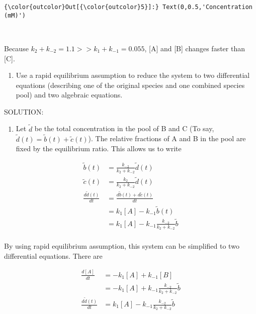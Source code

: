 \documentclass[11pt]{article}
\providecommand{\tightlist}{%
      \setlength{\itemsep}{0pt}\setlength{\parskip}{0pt}}
\begin{document}
\begin{Verbatim}[commandchars=\\\{\}]
{\color{outcolor}Out[{\color{outcolor}5}]:} Text(0,0.5,'Concentration (mM)')
\end{Verbatim}
            
    \begin{center}
    \end{center}
    { \hspace*{\fill} \\}
    
    Because \(k_{2} + k_{-2} = 1.1 >> k_{1} + k_{-1} = 0.055\), {[}A{]} and
{[}B{]} changes faster than {[}C{]}.

    \begin{enumerate}
\def\labelenumi{(\alph{enumi})}
\setcounter{enumi}{1}
\tightlist
\item
  Use a rapid equilibrium assumption to reduce the system to two
  differential equations (describing one of the original species and one
  combined species pool) and two algebraic equations.
\end{enumerate}

SOLUTION:

\begin{enumerate}
\def\labelenumi{\arabic{enumi}.}
\tightlist
\item
  Let \(\tilde{d}\) be the total concentration in the pool of B and C
  (To say, \(\tilde{d}(t) = \tilde{b}(t) + \tilde{c}(t)\)). The relative
  fractions of A and B in the pool are fixed by the equilibrium ratio.
  This allows us to write
\end{enumerate}

\[\begin{align}
\tilde{b}(t) &= \frac{k_{-2}}{k_{2}+k_{-2}}\tilde{d}(t) \\
\tilde{c}(t) &= \frac{k_{2}}{k_{2}+k_{-2}}\tilde{d}(t) \\
\frac{d\tilde{d}(t)}{dt} &= \frac{d\tilde{b}(t)+d\tilde{c}(t)}{dt} \\
&= k_{1}[A]-k_{-1}\tilde{b}(t) \\
&= k_{1}[A]-k_{-1}\frac{k_{-2}}{k_{2}+k_{-2}}\tilde{b} \\
\end{align}\]

By using rapid equilibrium assumption, this system can be simplified to
two differential equations. There are

\[\begin{align}
\frac{d[A]}{dt} &= -k_{1}[A] + k_{-1}[B] \\
&= -k_{1}[A] + k_{-1}\frac{k_{-2}}{k_{2}+k_{-2}}\tilde{b} \\
\frac{d\tilde{d}(t)}{dt} &= k_{1}[A]-k_{-1}\frac{k_{-2}}{k_{2}+k_{-2}}\tilde{b}
\end{align}\]
\end{document}
